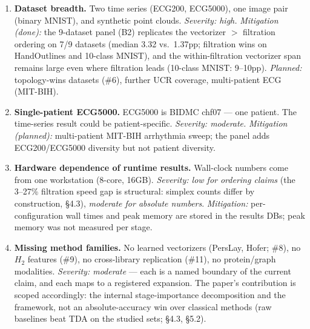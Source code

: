 \begin{enumerate}
  \item \textbf{Dataset breadth.} Two time series (ECG200, ECG5000), one
    image pair (binary MNIST), and synthetic point clouds. \emph{Severity:
    high.} \emph{Mitigation (done):} the 9-dataset panel (B2) replicates the
    vectorizer $>$ filtration ordering on 7/9 datasets (median 3.32 vs.\
    1.37pp; filtration wins on HandOutlines and 10-class MNIST), and the
    within-filtration vectorizer span remains large even where filtration
    leads (10-class MNIST: 9--10pp). \emph{Planned:} topology-wins datasets
    (\#6), further UCR coverage, multi-patient ECG (MIT-BIH).
  \item \textbf{Single-patient ECG5000.} ECG5000 is BIDMC chf07 --- one
    patient. The time-series result could be patient-specific.
    \emph{Severity: moderate.} \emph{Mitigation (planned):} multi-patient
    MIT-BIH arrhythmia sweep; the panel adds ECG200/ECG5000 diversity but not
    patient diversity.
  \item \textbf{Hardware dependence of runtime results.} Wall-clock numbers
    come from one workstation (8-core, 16GB). \emph{Severity: low for
    ordering claims} (the 3--27\% filtration speed gap is structural: simplex
    counts differ by construction, \S4.3), \emph{moderate for absolute
    numbers}. \emph{Mitigation:} per-configuration wall times and peak memory
    are stored in the results DBs; peak memory was not measured per stage.
  \item \textbf{Missing method families.} No learned vectorizers (PersLay,
    Hofer; \#8), no $H_2$ features (\#9), no cross-library replication
    (\#11), no protein/graph modalities. \emph{Severity: moderate} --- each
    is a named boundary of the current claim, and each maps to a registered
    expansion. The paper's contribution is scoped accordingly: the internal
    stage-importance decomposition and the framework, not an
    absolute-accuracy win over classical methods (raw baselines beat TDA on
    the studied sets; \S4.3, \S5.2).
\end{enumerate}

